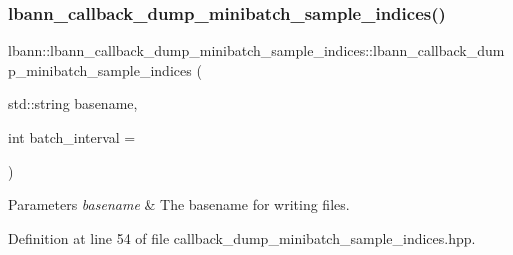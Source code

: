 \subsubsection{\texorpdfstring{lbann\+\_\+callback\+\_\+dump\+\_\+minibatch\+\_\+sample\+\_\+indices()}{lbann\_callback\_dump\_minibatch\_sample\_indices()}\hspace{0.1cm}{\footnotesize\ttfamily [1/2]}}
{\footnotesize\ttfamily lbann\+::lbann\+\_\+callback\+\_\+dump\+\_\+minibatch\+\_\+sample\+\_\+indices\+::lbann\+\_\+callback\+\_\+dump\+\_\+minibatch\+\_\+sample\+\_\+indices (\begin{DoxyParamCaption}\item[{std\+::string}]{basename,  }\item[{int}]{batch\+\_\+interval = {} }\end{DoxyParamCaption})\hspace{0.3cm}{\ttfamily [inline]}}


\begin{DoxyParams}{Parameters}
{\em basename} & The basename for writing files. \\
\hline
\end{DoxyParams}


Definition at line 54 of file callback\+\_\+dump\+\_\+minibatch\+\_\+sample\+\_\+indices.\+hpp.


